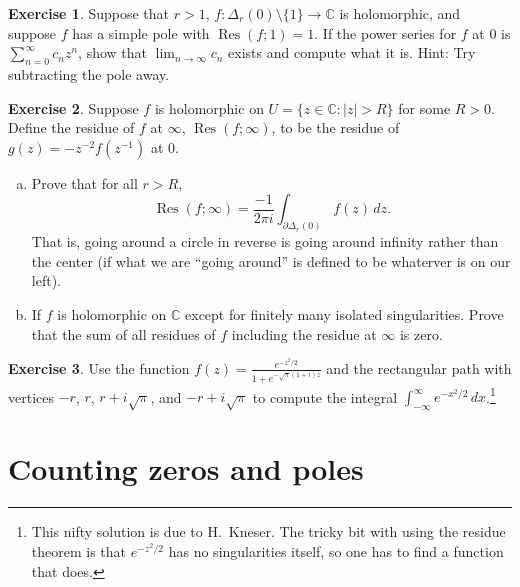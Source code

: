 \documentclass[12pt,openany]{book}
\newcommand{\sabs}[1]{\lvert {#1} \rvert}
\newcommand{\C}{{\mathbb{C}}}
\newcommand{\myquote}[1]{``#1''}
\theoremstyle{plain}
\theoremstyle{remark}
\theoremstyle{definition}
\newenvironment{exbox}{%
    \def\FrameCommand{\vrule width 1pt \relax\hspace{10pt}}%
    \MakeFramed{\advance\hsize-\width\FrameRestore}%
}{%
    \endMakeFramed
}
\newenvironment{exparts}{%
    \leavevmode\begin{enumerate}[a),noitemsep,topsep=0pt,parsep=0pt,partopsep=0pt]
}{%
    \end{enumerate}
}
\theoremstyle{exercise}
\newtheorem{exercise}{Exercise}[section]
\theoremstyle{example}
\begin{document}
\begin{savenotes}
\begin{exbox}
\begin{exercise}
Suppose that $r > 1$, $f \colon \Delta_r(0) \setminus \{ 1 \} \to \C$ is
holomorphic, and suppose $f$ has a simple pole with $\operatorname{Res}(f;1) = 1$.
If the power series for $f$ at 0 is $\sum_{n=0}^\infty c_n z^n$, show that
$\lim_{n\to \infty} c_n$ exists and compute what it is.  Hint: Try
subtracting the pole away.
\end{exercise}

\begin{exercise}
Suppose $f$ is holomorphic on $U = \{ z \in \C : \sabs{z} > R \}$ for 
some $R > 0$.  Define the residue of $f$ at $\infty$,
$\operatorname{Res}(f;\infty)$, to be the residue
of $g(z) = -z^{-2} f(z^{-1})$ at $0$.
\begin{exparts}
\item
Prove that for all $r > R$,
\begin{equation*}
\operatorname{Res}(f;\infty) = \frac{-1}{2\pi i} \int_{\partial \Delta_r(0)}
f(z) \, dz .
\end{equation*}
That is, going around a circle in reverse is going around infinity rather
than the center (if what we are \myquote{going around} is defined to be whaterver
is on our left).
\item
If $f$ is holomorphic on $\C$ except for finitely many isolated
singularities.  Prove that the sum of all residues of $f$ including the
residue at $\infty$ is zero.
\end{exparts}
\end{exercise}

\begin{exercise}
Use the function $f(z) = \frac{e^{-z^2/2}}{1+e^{-\sqrt{\pi}(1+i)z}}$ and
the rectangular path with vertices $-r$, $r$, $r+i\sqrt{\pi}$,
and $-r+i\sqrt{\pi}$
to compute the integral $\int_{-\infty}^\infty e^{-x^2/2} \, dx$.\footnote{%
This nifty solution is due to H.\ Kneser. The tricky bit with using the
residue theorem is that $e^{-z^2/2}$ has no singularities itself,
so one has to find a function that does.}
\end{exercise}
\end{exbox}
\end{savenotes}


\section{Counting zeros and poles}
\end{document}
